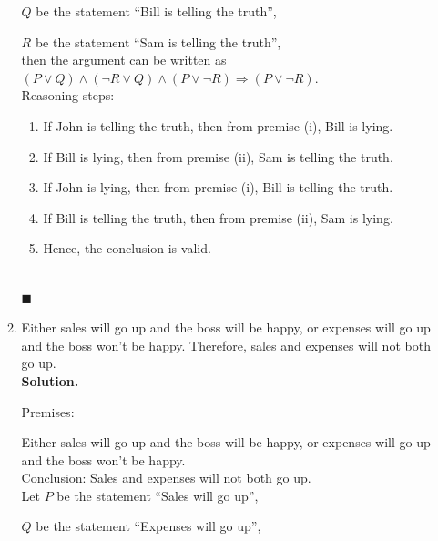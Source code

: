 \documentclass{report}
\newcommand{\sol}{\vspace{1em}\\\textbf{Solution.}\vspace{0.5em}}
\newcommand{\qed}{‎\\‎\hfill$\blacksquare$\vspace{1em}}
\begin{document}
\begin{enumerate}[leftmargin=*]
\begin{enumerate}
                        $Q$ be the statement ``Bill is telling the truth'',

                        $R$ be the statement ``Sam is telling the truth'',\\

                        then the argument can be written as $(P \vee Q) \wedge (\neg R \vee Q) \wedge
                              (P \vee \neg R) \Rightarrow (P \vee \neg R)$.\\

                        Reasoning steps:
                        \begin{enumerate}
                              \item If John is telling the truth, then from premise (i), Bill is lying.

                              \item If Bill is lying, then from premise (ii), Sam is telling the truth.

                              \item If John is lying, then from premise (i), Bill is telling the truth.

                              \item If Bill is telling the truth, then from premise (ii), Sam is lying.

                              \item Hence, the conclusion is valid.
                        \end{enumerate} \qed

                  \item Either sales will go up and the boss will be happy, or expenses will go up and
                        the boss won't be happy. Therefore, sales and expenses will not both go up.
                        \sol{}

                        Premises:

                        Either sales will go up and the boss will be happy, or expenses will go up and
                        the boss won't be happy.\\

                        Conclusion: Sales and expenses will not both go up.\\

                        Let $P$ be the statement ``Sales will go up'',

                        $Q$ be the statement ``Expenses will go up'',


\end{enumerate}
\end{enumerate}
\end{document}
